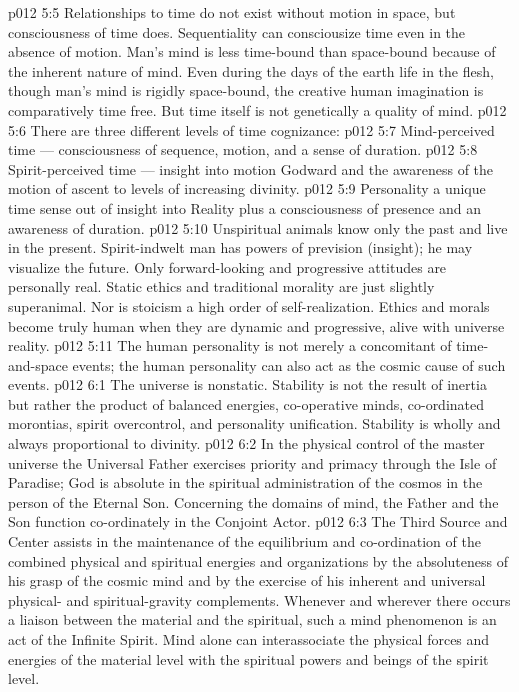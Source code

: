\vs p012 5:5 \pc Relationships to time do not exist without motion in space, but consciousness of time does. Sequentiality can consciousize time even in the absence of motion. Man’s mind is less time\hyp{}bound than space\hyp{}bound because of the inherent nature of mind. Even during the days of the earth life in the flesh, though man’s mind is rigidly space\hyp{}bound, the creative human imagination is comparatively time free. But time itself is not genetically a quality of mind.
\vs p012 5:6 \pc There are three different levels of time cognizance:
\vs p012 5:7 \bibnobreakspace Mind\hyp{}perceived time --- consciousness of sequence, motion, and a sense of duration.
\vs p012 5:8 \bibnobreakspace Spirit\hyp{}perceived time --- insight into motion Godward and the awareness of the motion of ascent to levels of increasing divinity.
\vs p012 5:9 \bibnobreakspace Personality  a unique time sense out of insight into Reality plus a consciousness of presence and an awareness of duration.
\vs p012 5:10 \pc Unspiritual animals know only the past and live in the present. Spirit\hyp{}indwelt man has powers of prevision (insight); he may visualize the future. Only forward\hyp{}looking and progressive attitudes are personally real. Static ethics and traditional morality are just slightly superanimal. Nor is stoicism a high order of self\hyp{}realization. Ethics and morals become truly human when they are dynamic and progressive, alive with universe reality.
\vs p012 5:11 The human personality is not merely a concomitant of time\hyp{}and\hyp{}space events; the human personality can also act as the cosmic cause of such events.
\vs p012 6:1 The universe is nonstatic. Stability is not the result of inertia but rather the product of balanced energies, co\hyp{}operative minds, co\hyp{}ordinated morontias, spirit overcontrol, and personality unification. Stability is wholly and always proportional to divinity.
\vs p012 6:2 In the physical control of the master universe the Universal Father exercises priority and primacy through the Isle of Paradise; God is absolute in the spiritual administration of the cosmos in the person of the Eternal Son. Concerning the domains of mind, the Father and the Son function co\hyp{}ordinately in the Conjoint Actor.
\vs p012 6:3 The Third Source and Center assists in the maintenance of the equilibrium and co\hyp{}ordination of the combined physical and spiritual energies and organizations by the absoluteness of his grasp of the cosmic mind and by the exercise of his inherent and universal physical\hyp{} and spiritual\hyp{}gravity complements. Whenever and wherever there occurs a liaison between the material and the spiritual, such a mind phenomenon is an act of the Infinite Spirit. Mind alone can interassociate the physical forces and energies of the material level with the spiritual powers and beings of the spirit level.
